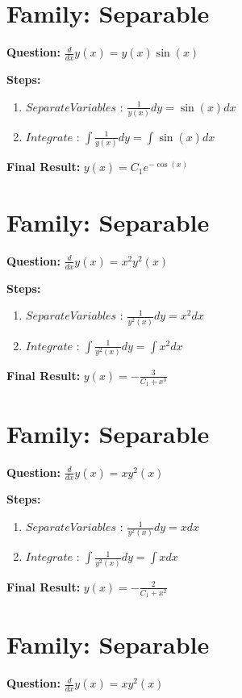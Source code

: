 \documentclass{article}
\begin{document}
\section*{Family: Separable}
\textbf{Question:} $\frac{d}{d x} y{\left(x \right)} = y{\left(x \right)} \sin{\left(x \right)}$

\textbf{Steps:}
\begin{enumerate}
\item $Separate Variables$ :  $\frac{1}{y{\left(x \right)}} dy = \sin{\left(x \right)} dx$
\item $Integrate$ :  $\int \frac{1}{y{\left(x \right)}} dy = \int \sin{\left(x \right)} dx$
\end{enumerate}
\textbf{Final Result:} $y{\left(x \right)} = C_{1} e^{- \cos{\left(x \right)}}$

\section*{Family: Separable}
\textbf{Question:} $\frac{d}{d x} y{\left(x \right)} = x^{2} y^{2}{\left(x \right)}$

\textbf{Steps:}
\begin{enumerate}
\item $Separate Variables$ :  $\frac{1}{y^{2}{\left(x \right)}} dy = x^{2} dx$
\item $Integrate$ :  $\int \frac{1}{y^{2}{\left(x \right)}} dy = \int x^{2} dx$
\end{enumerate}
\textbf{Final Result:} $y{\left(x \right)} = - \frac{3}{C_{1} + x^{3}}$

\section*{Family: Separable}
\textbf{Question:} $\frac{d}{d x} y{\left(x \right)} = x y^{2}{\left(x \right)}$

\textbf{Steps:}
\begin{enumerate}
\item $Separate Variables$ :  $\frac{1}{y^{2}{\left(x \right)}} dy = x dx$
\item $Integrate$ :  $\int \frac{1}{y^{2}{\left(x \right)}} dy = \int x dx$
\end{enumerate}
\textbf{Final Result:} $y{\left(x \right)} = - \frac{2}{C_{1} + x^{2}}$

\section*{Family: Separable}
\textbf{Question:} $\frac{d}{d x} y{\left(x \right)} = x y^{2}{\left(x \right)}$
\end{document}
